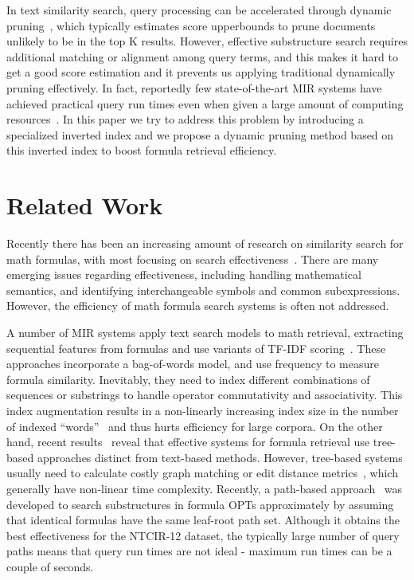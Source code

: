 \documentclass[runningheads]{llncs}
\begin{document}
In text similarity search, query processing can be accelerated through dynamic pruning~\cite{tonellotto2018efficient}, which typically estimates score upperbounds to prune documents unlikely to be in the top K results.
%
However, effective substructure search requires additional matching or alignment among query terms, and this makes it hard to get a good score estimation  and it prevents us applying traditional dynamically pruning effectively.
In fact, reportedly few state-of-the-art MIR systems have achieved practical query run times even when given a large amount of computing resources~\cite{ntcir12, mcat_16}.
In this paper we try to address this problem by introducing a specialized inverted index and we propose a dynamic pruning method based on this  inverted index to boost formula retrieval efficiency.

\section{Related Work}
\label{relatedworks}

Recently there has been an increasing amount of research on similarity search for math formulas, with most focusing on search effectiveness~\cite{a0_2019,tangent-combine2017,mcat_16,peking2016}.
There are many emerging issues regarding effectiveness, including handling mathematical semantics, and identifying interchangeable symbols and common subexpressions. However, the efficiency of math formula search systems is often not addressed.

%
A number of MIR systems apply text search models to math retrieval, extracting sequential features from formulas and use variants of TF-IDF scoring~\cite{nist_03, mias_11, peking2014}. These approaches incorporate a bag-of-words model, and use frequency to measure formula similarity. Inevitably, they need to index different combinations of sequences or substrings to handle operator commutativity and associativity.
This index augmentation results in a non-linearly increasing index size in the number of indexed ``words''~\cite{peking2014} and thus hurts efficiency for large corpora.
%
On the other hand, recent results~\cite{ntcir12, a0_2019, tangent_2019} reveal that effective systems for formula retrieval use tree-based approaches distinct from text-based methods.
%
However, tree-based systems usually need to calculate costly graph matching or edit distance metrics~\cite{tangent-multistage2016, edit_dist2013}, which generally have non-linear time complexity.
Recently, a path-based approach~\cite{a0_2019} was developed to search substructures in formula OPTs approximately by assuming that identical formulas have the same leaf-root path set.
Although it obtains the best effectiveness for the NTCIR-12 dataset, the typically large number of query paths means that query run times are not ideal  - maximum run times can be a couple of seconds.
\end{document}
